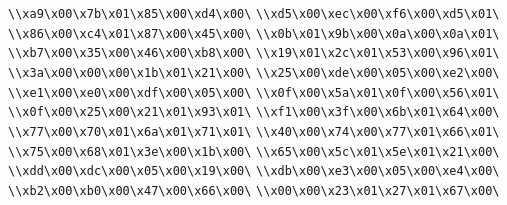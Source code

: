 \verb|\\xa9\x00\x7b\x01\x85\x00\xd4\x00\|\newline
\verb|\\xd5\x00\xec\x00\xf6\x00\xd5\x01\|\newline
\verb|\\x86\x00\xc4\x01\x87\x00\x45\x00\|\newline
\verb|\\x0b\x01\x9b\x00\x0a\x00\x0a\x01\|\newline
\verb|\\xb7\x00\x35\x00\x46\x00\xb8\x00\|\newline
\verb|\\x19\x01\x2c\x01\x53\x00\x96\x01\|\newline
\verb|\\x3a\x00\x00\x00\x1b\x01\x21\x00\|\newline
\verb|\\x25\x00\xde\x00\x05\x00\xe2\x00\|\newline
\verb|\\xe1\x00\xe0\x00\xdf\x00\x05\x00\|\newline
\verb|\\x0f\x00\x5a\x01\x0f\x00\x56\x01\|\newline
\verb|\\x0f\x00\x25\x00\x21\x01\x93\x01\|\newline
\verb|\\xf1\x00\x3f\x00\x6b\x01\x64\x00\|\newline
\verb|\\x77\x00\x70\x01\x6a\x01\x71\x01\|\newline
\verb|\\x40\x00\x74\x00\x77\x01\x66\x01\|\newline
\verb|\\x75\x00\x68\x01\x3e\x00\x1b\x00\|\newline
\verb|\\x65\x00\x5c\x01\x5e\x01\x21\x00\|\newline
\verb|\\xdd\x00\xdc\x00\x05\x00\x19\x00\|\newline
\verb|\\xdb\x00\xe3\x00\x05\x00\xe4\x00\|\newline
\verb|\\xb2\x00\xb0\x00\x47\x00\x66\x00\|\newline
\verb|\\x00\x00\x23\x01\x27\x01\x67\x00\|\newline
